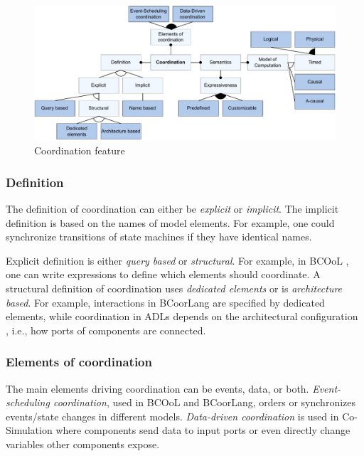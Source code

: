 \documentclass[runningheads]{llncs}
\begin{document}
\begin{figure}[ht]
	\centering
	\includegraphics[width=1\textwidth]{images/coordination_feature}
	\caption{Coordination feature}
	\label{fig:coordinationFeature}
\end{figure}

\subsubsection{Definition} The definition of coordination can either be \textit{explicit} or \textit{implicit}.
The implicit definition is based on the names of model elements.
For example, one could synchronize transitions of state machines if they have identical names.

Explicit definition is either \textit{query based} or \textit{structural}.
For example, in BCOoL \cite{varalarsenBCOolBehavioralCoordination2016,varalarsenBehavioralCoordinationOperator2015}, one can write expressions to define which elements should coordinate.
A structural definition of coordination uses \textit{dedicated elements} or is \textit{architecture based}.
For example, interactions in BCoorLang are specified by dedicated elements, while coordination in ADLs depends on the architectural configuration \cite{medvidovicClassificationComparisonFramework2000}, i.e., how ports of components are connected.

\subsubsection{Elements of coordination} The main elements driving coordination can be events, data, or both.
\textit{Event-scheduling coordination}, used in BCOoL and BCoorLang, orders or synchronizes events/state changes in different models.
\textit{Data-driven coordination} is used in Co-Simulation where components send data to input ports or even directly change variables other components expose.
\end{document}
